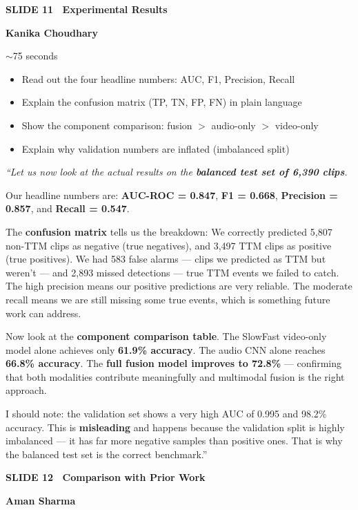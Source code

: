 \documentclass[11pt, a4paper]{article}
\newcommand{\slideheading}[3]{%
  \vspace{0.6cm}
  \begin{tcolorbox}[slidebox]
    \textbf{\color{NavyBlue}SLIDE #1 \textemdash\ #2}\\[2pt]
    \begin{tcolorbox}[presenterbox, title=Presenter(s)]
      \color{AccBlue}\bfseries #3
    \end{tcolorbox}
  \end{tcolorbox}
}
\newcommand{\timing}[1]{%
  \begin{tcolorbox}[timebox, title=Suggested Time]
    \color{AccOrange} #1
  \end{tcolorbox}
}
\newcommand{\keypoints}[1]{%
  \begin{tcolorbox}[keybox, title=Key Points to Cover]
    #1
  \end{tcolorbox}
}
\newcommand{\script}[1]{%
  \begin{mdframed}[
    backgroundcolor=white,
    linecolor=MidText!40,
    linewidth=0.5pt,
    leftmargin=0pt,
    rightmargin=0pt,
    innerleftmargin=10pt,
    innerrightmargin=8pt,
    innertopmargin=8pt,
    innerbottommargin=8pt,
    roundcorner=3pt
  ]
  \itshape\color{MidText}
  #1
  \end{mdframed}
}
\begin{document}
\slideheading{11}{Experimental Results}{Kanika Choudhary}

\timing{$\sim$75 seconds}

\keypoints{%
\begin{itemize}[leftmargin=*, itemsep=2pt]
  \item Read out the four headline numbers: AUC, F1, Precision, Recall
  \item Explain the confusion matrix (TP, TN, FP, FN) in plain language
  \item Show the component comparison: fusion $>$ audio-only $>$ video-only
  \item Explain why validation numbers are inflated (imbalanced split)
\end{itemize}
}

\script{%
``Let us now look at the actual results on the \textbf{balanced test set of 6,390 clips}.

Our headline numbers are: \textbf{AUC-ROC = 0.847}, \textbf{F1 = 0.668}, \textbf{Precision = 0.857}, and \textbf{Recall = 0.547}.

The \textbf{confusion matrix} tells us the breakdown: We correctly predicted 5,807 non-TTM clips as negative (true negatives), and 3,497 TTM clips as positive (true positives). We had 583 false alarms --- clips we predicted as TTM but weren't --- and 2,893 missed detections --- true TTM events we failed to catch. The high precision means our positive predictions are very reliable. The moderate recall means we are still missing some true events, which is something future work can address.

Now look at the \textbf{component comparison table}. The SlowFast video-only model alone achieves only \textbf{61.9\% accuracy}. The audio CNN alone reaches \textbf{66.8\% accuracy}. The \textbf{full fusion model improves to 72.8\%} --- confirming that both modalities contribute meaningfully and multimodal fusion is the right approach.

I should note: the validation set shows a very high AUC of 0.995 and 98.2\% accuracy. This is \textbf{misleading} and happens because the validation split is highly imbalanced --- it has far more negative samples than positive ones. That is why the balanced test set is the correct benchmark.''
}

\slideheading{12}{Comparison with Prior Work}{Aman Sharma}
\end{document}
